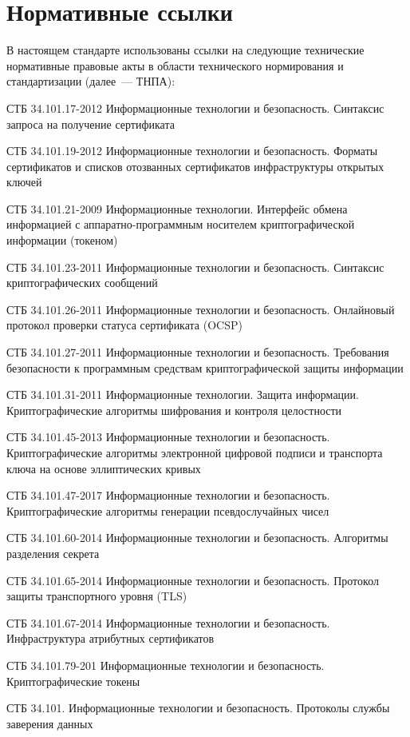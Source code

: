 \chapter{Нормативные ссылки}

В настоящем стандарте использованы ссылки на следующие технические 
нормативные правовые акты в области технического нормирования и 
стандартизации (далее~--– ТНПА): 
 
СТБ 34.101.17-2012 Информационные технологии и безопасность. Синтаксис 
запроса на получение сертификата

СТБ 34.101.19-2012 Информационные технологии и безопасность. Форматы 
сертификатов и списков отозванных сертификатов инфраструктуры открытых 
ключей 

СТБ 34.101.21-2009 Информационные технологии. Интерфейс обмена информацией
с аппаратно-программным носителем криптографической информации (токеном)

СТБ 34.101.23-2011 Информационные технологии и безопасность. Синтаксис 
криптографических сообщений

СТБ 34.101.26-2011 Информационные технологии и безопасность. Онлайновый 
протокол проверки статуса сертификата (OCSP)

СТБ 34.101.27-2011 Информационные технологии и безопасность. Требования 
безопасности к программным средствам криптографической защиты информации 

СТБ 34.101.31-2011 Информационные технологии. Защита информации. 
Криптографические алгоритмы шифрования и контроля целостности

СТБ 34.101.45-2013 Информационные технологии и безопасность. 
Криптографические алгоритмы электронной цифровой подписи и транспорта 
ключа на основе эллиптических кривых 

СТБ 34.101.47-2017 Информационные технологии и безопасность. 
Криптографические алгоритмы генерации псевдослучайных чисел 

СТБ 34.101.60-2014 Информационные технологии и безопасность. 
Алгоритмы разделения секрета

СТБ 34.101.65-2014 Информационные технологии и безопасность. 
Протокол защиты транспортного уровня (TLS)

СТБ 34.101.67-2014 Информационные технологии и безопасность. 
Инфраструктура атрибутных сертификатов 

СТБ 34.101.79-201 
Информационные технологии и безопасность. Криптографические токены

СТБ 34.101. Информационные технологии и безопасность. 
Протоколы службы заверения данных

